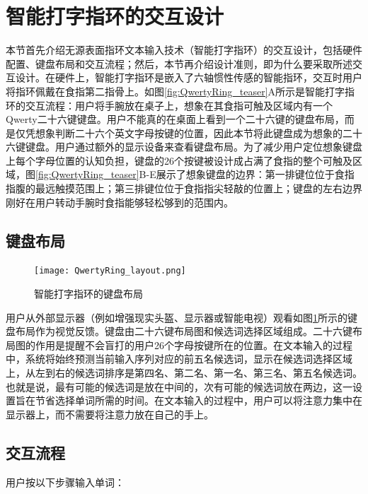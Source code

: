 \section{智能打字指环的交互设计}

本节首先介绍无源表面指环文本输入技术（智能打字指环）的交互设计，包括硬件配置、键盘布局和交互流程；然后，本节再介绍设计准则，即为什么要采取所述交互设计。在硬件上，智能打字指环是嵌入了六轴惯性传感的智能指环，交互时用户将指环佩戴在食指第二指骨上。如图\ref{fig:QwertyRing_teaser}A所示是智能打字指环的交互流程：用户将手腕放在桌子上，想象在其食指可触及区域内有一个Qwerty二十六键键盘。用户不能真的在桌面上看到一个二十六键的键盘布局，而是仅凭想象判断二十六个英文字母按键的位置，因此本节将此键盘成为想象的二十六键键盘。用户通过额外的显示设备来查看键盘布局。为了减少用户定位想象键盘上每个字母位置的认知负担，键盘的26个按键被设计成占满了食指的整个可触及区域，图\ref{fig:QwertyRing_teaser}B-E展示了想象键盘的边界：第一排键位位于食指指腹的最远触摸范围上；第三排键位位于食指指尖轻敲的位置上；键盘的左右边界刚好在用户转动手腕时食指能够轻松够到的范围内。

\subsection{键盘布局}

\begin{figure}
	\centering
	\texttt{[image: QwertyRing\_layout.png]}
	\caption*{图中展示了智能打字指环的键盘布局，Rank-1表示最有可能的候选词。字母Q、A、Z
		、P、M的中心坐标位置是(0,0)、(0.2,1)、(0.8,2)、(9,0)和(6.8)。}
	\caption{智能打字指环的键盘布局}
	\label{fig:QwertyRing_layout}
\end{figure}

用户从外部显示器（例如增强现实头盔、显示器或智能电视）观看如图\ref{fig:QwertyRing_layout}所示的键盘布局作为视觉反馈。键盘由二十六键布局图和候选词选择区域组成。二十六键布局图的作用是提醒不会盲打的用户26个字母按键所在的位置。在文本输入的过程中，系统将始终预测当前输入序列对应的前五名候选词，显示在候选词选择区域上，从左到右的候选词排序是第四名、第二名、第一名、第三名、第五名候选词。也就是说，最有可能的候选词是放在中间的，次有可能的候选词放在两边，这一设置旨在节省选择单词所需的时间。在文本输入的过程中，用户可以将注意力集中在显示器上，而不需要将注意力放在自己的手上。

\subsection{交互流程}

用户按以下步骤输入单词：

